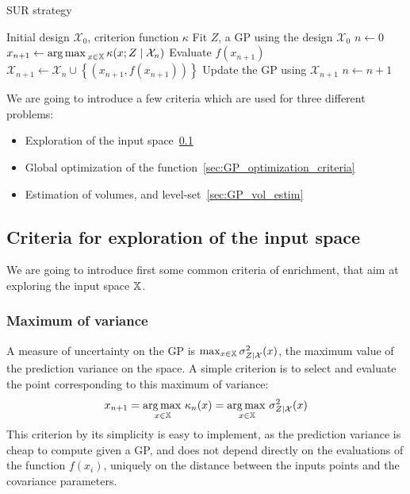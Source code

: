 \documentclass[../../Main_ManuscritThese.tex]{subfiles}
\begin{document}
\begin{algorithm}
  \caption{\label{alg:SUR_strat} SUR strategy}
\begin{algorithmic}
\REQUIRE Initial design $\mathcal{X}_0$, criterion function $\kappa$
\STATE Fit $Z$, a GP using the design $\mathcal{X}_0$
\STATE $n \leftarrow 0$
\STATE $x_{n+1} \leftarrow \operatorname*{arg\,max \,}_{x \in \mathbb{X}} \kappa(x; Z \mid \mathcal{X}_{n})$
\STATE Evaluate $f(x_{n+1})$
\STATE $\mathcal{X}_{n+1} \leftarrow \mathcal{X}_n \cup \left\{\left(x_{n+1}, f(x_{n+1})\right)\right\}$
\STATE Update the GP using $\mathcal{X}_{n+1}$
\STATE $n \leftarrow n + 1$
\ENDWHILE
\end{algorithmic}
\end{algorithm}

We are going to introduce a few criteria which are used for three different problems:
\begin{itemize}
\item Exploration of the input space~\cref{sec:exploration_criteria}
\item Global optimization of the function~\cref{sec:GP_optimization_criteria}
\item Estimation of volumes, and level-set~\cref{sec:GP_vol_estim} 
\end{itemize}

\subsection{Criteria for exploration of the input space}
\label{sec:exploration_criteria}
We are going to introduce first some common criteria of enrichment, that aim at exploring the input space $\mathbb{X}$.

\subsubsection{Maximum of variance}
A measure of uncertainty on the GP is $\max_{x\in\mathbb{X}} \sigma_{Z \mid \mathcal{X}}^2(x)$, the maximum value of the prediction variance on the space.
A simple criterion is to select and evaluate the point corresponding to this maximum of variance:
\begin{equation}
  x_{n+1} = \operatorname*{arg\,max \,}_{x\in \mathbb{X}} \kappa_n(x) = \operatorname*{arg\,max \,}_{x \in \mathbb{X}} \sigma^2_{Z \mid \mathcal{X}}(x)
\end{equation}
This criterion by its simplicity is easy to implement, as the prediction variance is cheap to compute given a GP, and does not depend directly on the evaluations of the function $f(x_i)$, uniquely on the distance between the inputs points and the covariance parameters.
\end{document}
